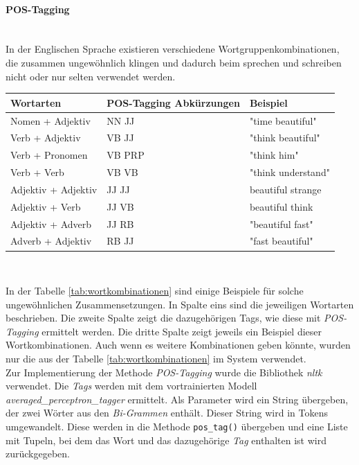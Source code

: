 \paragraph{POS-Tagging}\mbox{}\\
In der Englischen Sprache existieren verschiedene Wortgruppenkombinationen, die zusammen ungewöhnlich klingen und dadurch beim sprechen und schreiben nicht oder nur selten verwendet werden.
\begin{center}
	\begin{tabularx}{1\textwidth} { 
			| >{\raggedright\arraybackslash}X 
			| >{\raggedright\arraybackslash}X
			| >{\raggedright\arraybackslash}X | }
		\hline
		Wortarten & POS-Tagging Abkürzungen & Beispiel \\
		\hline
		\hline
		Nomen + Adjektiv & NN JJ & "time beautiful"\\
		\hline
		Verb + Adjektiv & VB JJ & "think beautiful"\\
		\hline
		Verb + Pronomen & VB PRP & "think him"\\
		\hline
		Verb + Verb & VB VB & "think understand"\\
		\hline
		Adjektiv + Adjektiv & JJ JJ & beautiful strange\\
		\hline
		Adjektiv + Verb & JJ VB & beautiful think\\
		\hline
		Adjektiv + Adverb & JJ RB & "beautiful fast"\\
		\hline
		Adverb + Adjektiv & RB JJ & "fast beautiful"\\
		\hline
	\end{tabularx}\\
	\label{tab:wortkombinationen}
\end{center}
In der Tabelle \ref{tab:wortkombinationen} sind einige Beispiele für solche ungewöhnlichen Zusammensetzungen. In Spalte eins sind die jeweiligen Wortarten beschrieben. Die zweite Spalte zeigt die dazugehörigen Tags, wie diese mit \emph{POS-Tagging} ermittelt werden. Die dritte Spalte zeigt jeweils ein Beispiel dieser Wortkombinationen. Auch wenn es weitere Kombinationen geben könnte, wurden nur die aus der Tabelle \ref{tab:wortkombinationen} im System verwendet.\\

Zur Implementierung der Methode \emph{POS-Tagging} wurde die Bibliothek \emph{nltk} verwendet. Die \emph{Tags} werden mit dem vortrainierten Modell \emph{averaged\_perceptron\_tagger} ermittelt.
Als Parameter wird ein String übergeben, der zwei Wörter aus den \emph{Bi-Grammen} enthält. Dieser String wird in Tokens umgewandelt. Diese werden in die Methode \lstinline{pos_tag()}
übergeben und eine Liste mit Tupeln, bei dem das Wort und das dazugehörige \emph{Tag} enthalten ist wird zurückgegeben.
